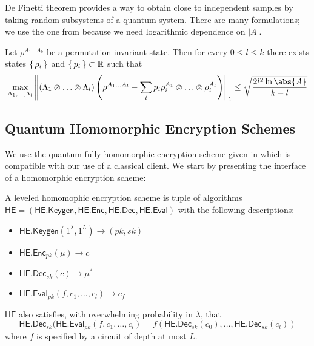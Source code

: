\begin{definition} [$\BQP$]
De Finetti theorem provides a way to obtain close to independent samples by taking random subsystems of a quantum system.
There are many formulations; we use the one from \cite{Brandão2017} because we need logarithmic dependence on $|A|$.
\begin{thm}
	\label{deFinetti}
	Let $\rho^{A_1\ldots A_k}$ be a permutation-invariant state. Then for every $0\leq l\leq k$ there exists states $\set{\rho_i}$ and $\set{p_i}\subset\mathbb{R}$ such that
	$$\max_{\Lambda_1,\ldots,\Lambda_l}\norm{(\Lambda_1\otimes\ldots\otimes\Lambda_l)\left(\rho^{A_1\ldots A_l}-\sum_ip_i\rho_i^{A_1}\otimes\ldots\otimes\rho_i^{A_l}\right)}_1\leq\sqrt{\frac{2l^2\ln\abs{A}}{k-l}}$$
\end{thm}

\subsection{Quantum Homomorphic Encryption Schemes}

\def\QHE{\mathsf{QHE}}
\def\QGen{\mathsf{QHE.Keygen}}
\def\QEnc{\mathsf{QHE.Enc}}
\def\QEval{\mathsf{QHE.Eval}}
\def\QDec{\mathsf{QHE.Dec}}

We use the quantum fully homomorphic encryption scheme given in \cite{mahadev_qfhe} which is compatible with our use of a classical client. We start by presenting the interface of a homomorphic encryption scheme:
\begin{dfn}
	A leveled homomophic encryption scheme is tuple of algorithms $\mathsf{HE}=(\mathsf{HE.Keygen}, \mathsf{HE.Enc}, \mathsf{HE.Dec}, \mathsf{HE.Eval})$ with the following descriptions:
	\begin{itemize}
		\item $\mathsf{HE.Keygen}(1^\lambda, 1^L)\rightarrow(pk, sk)$
		\item $\mathsf{HE.Enc}_{pk}(\mu)\rightarrow c$
		\item $\mathsf{HE.Dec}_{sk}(c)\rightarrow \mu^*$
		\item $\mathsf{HE.Eval}_{pk}(f, c_1, \ldots, c_l)\rightarrow c_f$
	\end{itemize}
\end{dfn}

$\mathsf{HE}$ also satisfies, with overwhelming probability in $\lambda$, that
$$\mathsf{HE.Dec}_{sk}(\mathsf{HE.Eval}_{pk}(f, c_1, \ldots, c_l)=f(\mathsf{HE.Dec}_{sk}(c_0),\ldots,\mathsf{HE.Dec}_{sk}(c_l))$$
where $f$ is specified by a circuit of depth at most $L$.



\end{definition}
